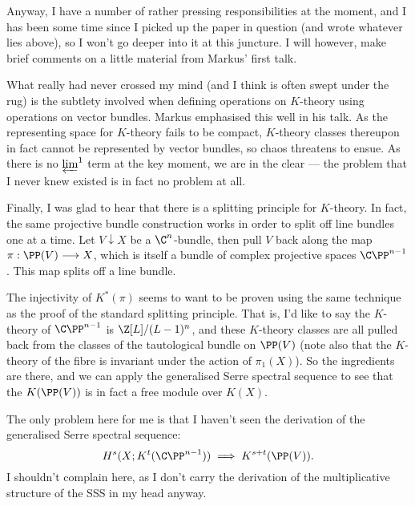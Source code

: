 \documentclass[11pt]{article}
\begin{document}
\begin{HopfInvOne}
Anyway, I have a number of rather pressing responsibilities at the moment, and I has been some time since I picked up the paper in question (and wrote whatever lies above), so I won't go deeper into it at this juncture. I will however, make brief comments on a little material from Markus' first talk.

What really had never crossed my mind (and I think is often swept under the rug) is the subtlety involved when defining operations on $K$-theory using operations on vector bundles. Markus emphasised this well in his talk. As the representing space for $K$-theory fails to be compact, $K$-theory classes thereupon in fact cannot be represented by vector bundles, so chaos threatens to ensue. As there is no $\varprojlim^1$ term at the key moment, we are in the clear --- the problem that I never knew existed is in fact no problem at all.

Finally, I was glad to hear that there is a splitting principle for $K$-theory. In fact, the same projective bundle construction works in order to split off line bundles one at a time.  Let $V\downarrow X$ be a $\C^n$-bundle, then pull $V$ back along the map $\pi:\PP(V)\to X$, which is itself a bundle of complex projective spaces $\CP^{n-1}$. This map splits off a line bundle.

The injectivity of $K^*(\pi)$ seems to want to be proven using the same technique as the proof of the standard splitting principle. That is, I'd like to say the $K$-theory of $\CP^{n-1}$ is $\Z[L]/(L-1)^{n}$, and these $K$-theory classes are all pulled back from the classes of the tautological bundle on $\PP(V)$ (note also that the $K$-theory of the fibre is invariant under the action of $\pi_1(X)$). So the ingredients are there, and we can apply the generalised Serre spectral sequence to see that the $K(\PP(V))$ is in fact a free module over $K(X)$.

The only problem here for me is that I haven't seen the derivation of the generalised Serre spectral sequence:
\[H^s(X;K^t(\CP^{n-1}))\implies K^{s+t}(\PP(V)).\]
I shouldn't complain here, as I don't carry the derivation of the multiplicative structure of the SSS in my head anyway.


\pagebreak
\end{HopfInvOne}
\end{document}
